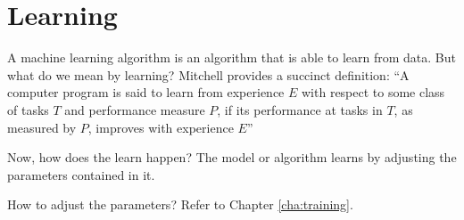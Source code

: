 
\chapter{Learning}
\label{cha:learning}

A machine learning algorithm is an algorithm that is able to learn from data.
But what do we mean by learning?
Mitchell provides a succinct definition:
``A computer program is said to learn from experience $E$ with respect to some class of tasks $T$ and performance measure $P$, if its performance at tasks in $T$, as measured by $P$, improves with experience $E$''


Now, how does the learn happen?
The model or algorithm learns by adjusting the parameters contained in it.

How to adjust the parameters?
Refer to Chapter \ref{cha:training}.


